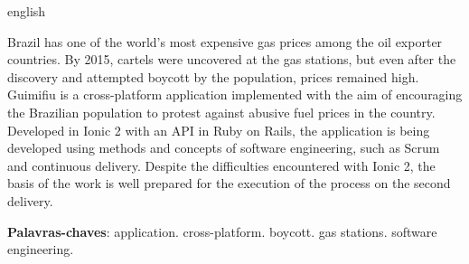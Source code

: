 \begin{resumo}[Abstract]
 \begin{otherlanguage*}{english}

     Brazil has one of the world's most expensive gas prices among the oil exporter countries. By 2015, cartels were uncovered at the gas stations, but even after the discovery and attempted boycott by the population, prices remained high. Guimifiu is a cross-platform application implemented with the aim of encouraging the Brazilian population to protest against abusive fuel prices in the country. Developed in Ionic 2 with an API in Ruby on Rails, the application is being developed using methods and concepts of software engineering, such as Scrum and continuous delivery. Despite the difficulties encountered with Ionic 2, the basis of the work is well prepared for the execution of the process on the second delivery.

     \vspace{\onelineskip}
        
     \noindent
     \textbf{Palavras-chaves}: application. cross-platform. boycott. gas stations. software engineering. 
 \end{otherlanguage*}
\end{resumo}
